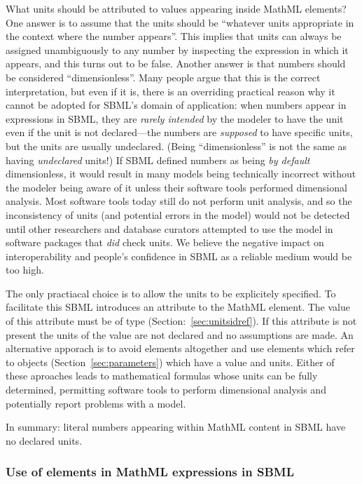 What units should be attributed to values appearing inside MathML
 elements?  One answer is to assume that the units
should be ``whatever units appropriate in the context where the
number appears''.  This implies that units can always be assigned
unambiguously to any number by inspecting the expression in which
it appears, and this turns out to be false.  Another answer is
that numbers should be considered ``dimensionless''.  Many people
argue that this is the correct interpretation, but even if it is,
there is an overriding practical reason why it cannot be adopted
for SBML's domain of application: when numbers appear in 
expressions in SBML, they are \emph{rarely intended} by the
modeler to have the unit  even if
the unit is not declared---the numbers are \emph{supposed} to
have specific units, but the units are usually undeclared.  (Being
``dimensionless'' is not the same as having \emph{undeclared}
units!)  If SBML defined numbers as being \emph{by default}
dimensionless, it would result in many models being technically
incorrect without the modeler being aware of it unless their
software tools performed dimensional analysis.  Most software
tools today still do not perform unit analysis, and so the
inconsistency of units (and potential errors in the model) would not
be detected until other researchers and database curators
attempted to use the model in software packages that \emph{did}
check units.  We believe the negative impact on interoperability
and people's confidence in SBML as a reliable medium would be too
high.

The only practiacal choice is to allow the units to be explicitely
specified. To facilitate this SBML introduces an attribute
 to the MathML  element. The value of
this attribute must be of type 
(Section:~\vref{sec:unitsidref}). If this attribute is not present
the units of the value are not declared and no assumptions are
made. An alternative apporach is to avoid  elements
altogether and use  elements which refer to \Parameter
objects (Section~\ref{sec:parameters}) which have a value and
units. Either of these aproaches leads to mathematical formulas
whose units can be fully determined, permitting software tools to
perform dimensional analysis and potentially report problems with
a model. 

In summary: literal numbers appearing within MathML content in
SBML have no declared units.

\subsubsection{Use of  elements in MathML expressions in SBML}
\label{sec:ci-token}

